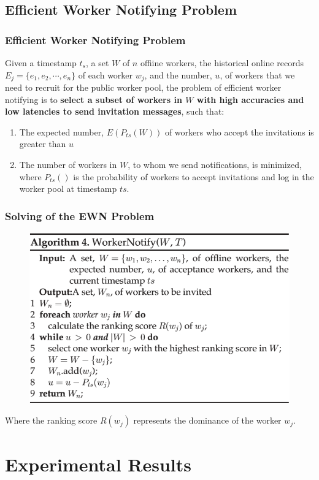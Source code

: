 \documentclass[UTF8]{beamer}
\begin{document}
\subsection{Efficient Worker Notifying Problem}
\begin{frame}
    \frametitle{Efficient Worker Notifying Problem}
    Given a timestamp $t_s$, a set $W$ of $n$ offiine 
    workers, the historical online records $E_j = \{e_1, e_2, \cdots , e_n\}$ 
    of each worker $w_j$, and the number, $u$, of 
    workers that we need to recruit for the public 
    worker pool, the problem of efficient worker notifying is
    to \textbf{select a subset of workers in $W$ with 
    high accuracies and low latencies to send 
    invitation messages}, such that:
    \begin{enumerate}
        \item  The expected number, $E(P_{ts}(W))$ 
        of workers who accept the invitations is greater than $u$
        \item The number of workers in $W$, to whom we send notifications, 
        is minimized, where $P_{ts}()$ is the probability of 
        workers to accept invitations and log in the worker 
        pool at timestamp $ts$. 
    \end{enumerate}
\end{frame}

\begin{frame}
    \frametitle{Solving of the EWN Problem }
    \begin{figure}
        \includegraphics[width= 0.65\linewidth]{ALGO3.png}
     \end{figure}
     Where the ranking score $R(w_j)$ represents the dominance
     of the worker $w_j$.
\end{frame}

\section{Experimental Results}
\end{document}
